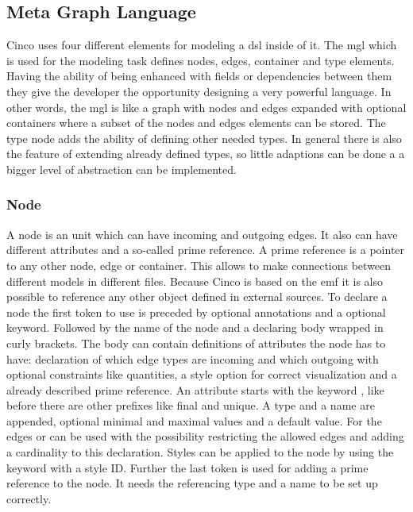 \subsection{Meta Graph Language}
Cinco uses four different elements for modeling a \gls{dsl} inside of it. The \gls{mgl} which is used for the modeling task defines nodes, edges, container and type elements. Having the ability of being enhanced with fields or dependencies between them they give the developer the opportunity designing a very powerful language. In other words, the \gls{mgl} is like a graph with nodes and edges expanded with optional containers where a subset of the nodes and edges elements can be stored. The type node adds the ability of defining other needed types. In general there is also the feature of extending already defined types, so little adaptions can be done a a bigger level of abstraction can be implemented.

\subsubsection{Node}

A node is an unit which can have incoming and outgoing edges. It also can have different attributes and a so-called prime reference. A prime reference is a pointer to any other node, edge or container. This allows to make connections between different models in different files. Because Cinco is based on the \gls{emf} it is also possible to reference any other object defined in external sources. To declare a node the first token to use is  preceded by optional annotations and a optional  keyword. Followed by the name of the node and a declaring body wrapped in curly brackets. The body can contain definitions of attributes the node has to have: declaration of which edge types are incoming and which outgoing with optional constraints like quantities, a style option for correct visualization and a already described prime reference. An attribute starts with the keyword , like before there are other prefixes like final and unique. A type and a name are appended, optional minimal and maximal values and a default value. For the edges  or  can be used with the possibility restricting the allowed edges and adding a cardinality to this declaration. Styles can be applied to the node by using the  keyword with a style ID.
Further the last token  is used for adding a prime reference to the node. It needs the referencing type and a name to be set up correctly.

